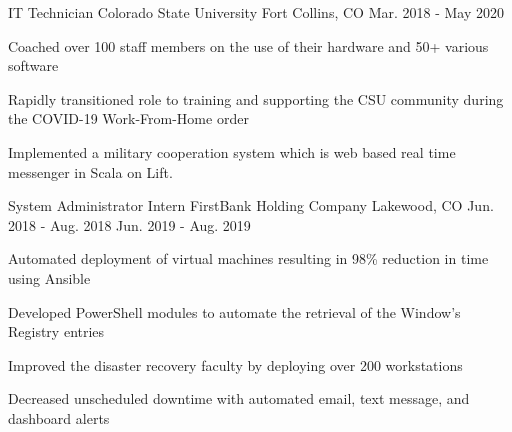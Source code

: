 \begin{cventries}
  \cventry
    {IT Technician} %
    {Colorado State University} %
    {Fort Collins, CO} %
    {Mar. 2018 - May 2020} %
    {
      \begin{cvitems} %
        \item {Coached over 100 staff members on the use of their hardware and 50+ various software}
        \item {Rapidly transitioned role to training and supporting the CSU community during the COVID-19 Work-From-Home order}
        \item {Implemented a military cooperation system which is web based real time messenger in Scala on Lift.}
      \end{cvitems}
    }

  \twodates
    {System Administrator Intern} %
    {FirstBank Holding Company} %
    {Lakewood, CO} %
    {Jun. 2018 - Aug. 2018} %
    {Jun. 2019 - Aug. 2019}
    {
      \begin{cvitems} %
        \item {Automated deployment of virtual machines resulting in 98\% reduction in time using Ansible}
        \item {Developed PowerShell modules to automate the retrieval of the Window’s Registry entries}
        \item {Improved the disaster recovery faculty by deploying over 200 workstations}
        \item {Decreased unscheduled downtime with automated email, text message, and dashboard alerts}
      \end{cvitems}
    }
    

\end{cventries}
